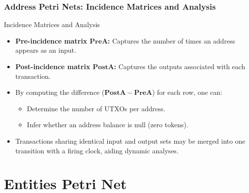 \documentclass{beamer}
\begin{document}
\begin{frame}
    \frametitle{Address Petri Nets: Incidence Matrices and Analysis}
    \begin{block}{Incidence Matrices and Analysis}
        \begin{itemize}
            \item \textbf{Pre-incidence matrix \(\mathbf{PreA}\):} Captures the number of times an address appears as an input.
            \item \textbf{Post-incidence matrix \(\mathbf{PostA}\):} Captures the outputs associated with each transaction.
            \item By computing the difference (\(\mathbf{PostA} - \mathbf{PreA}\)) for each row, one can:
                  \begin{itemize}
                      \item Determine the number of UTXOs per address.
                      \item Infer whether an address balance is null (zero tokens).
                  \end{itemize}
            \item Transactions sharing identical input and output sets may be merged into one transition with a firing clock, aiding dynamic analyses.
        \end{itemize}
    \end{block}

\end{frame}


\section{Entities Petri Net}
\end{document}
